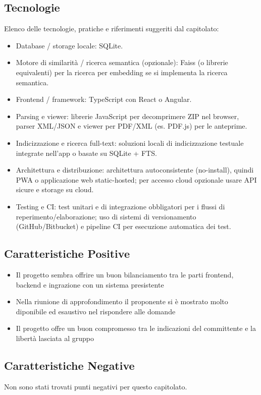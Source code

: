 \documentclass[a4paper,12pt]{article}
\begin{document}
    \subsection{Tecnologie}
    Elenco delle tecnologie, pratiche e riferimenti suggeriti dal capitolato:
    \begin{itemize}
        \item Database / storage locale: SQLite. 
        \item Motore di similarità / ricerca semantica (opzionale): Faiss (o librerie equivalenti) per la ricerca per embedding se si implementa la ricerca semantica. 
        \item Frontend / framework: TypeScript con React o Angular. 
        \item Parsing e viewer: librerie JavaScript per decomprimere ZIP nel browser, parser XML/JSON e viewer per PDF/XML (es. PDF.js) per le anteprime. 
        \item Indicizzazione e ricerca full-text: soluzioni locali di indicizzazione testuale integrate nell’app o basate su SQLite + FTS. 
        \item Architettura e distribuzione: architettura autoconsistente (no-install), quindi PWA o applicazione web static-hosted; per accesso cloud opzionale usare API sicure e storage su cloud. 
        \item Testing e CI: test unitari e di integrazione obbligatori per i flussi di reperimento/elaborazione; uso di sistemi di versionamento (GitHub/Bitbucket) e pipeline CI per esecuzione automatica dei test. 
    \end{itemize}

    \subsection{Caratteristiche Positive}
    \begin{itemize}
        \item Il progetto sembra offrire un buon bilanciamento tra le parti frontend, backend e ingrazione con un sistema presistente 
        \item Nella riunione di approfondimento il proponente si è mostrato molto diponibile ed esaustivo nel rispondere alle domande
        \item Il progetto offre un buon compromesso tra le indicazioni del committente e la libertà lasciata al gruppo
    \end{itemize}
    \subsection{Caratteristiche Negative}
    Non sono stati trovati punti negativi per questo capitolato.
\end{document}
